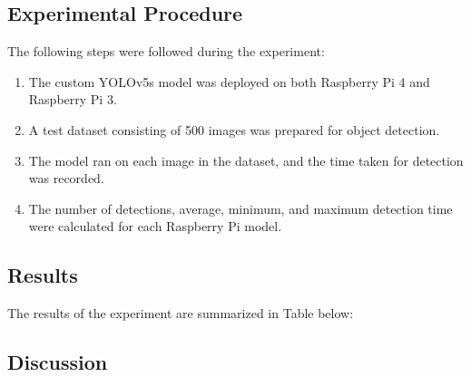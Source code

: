 \subsection{Experimental Procedure}
\vspace{1cm}
The following steps were followed during the experiment:

\begin{enumerate}
  \item The custom YOLOv5s model was deployed on both Raspberry Pi 4 and Raspberry Pi 3.
  \item A test dataset consisting of 500 images was prepared for object detection.
  \item The model ran on each image in the dataset, and the time taken for detection was recorded.
  \item The number of detections, average, minimum, and maximum detection time were calculated for each Raspberry Pi model.
\end{enumerate}

\subsection{Results}

The results of the experiment are summarized in Table below:
\FloatBarrier
\begin{table}[htbp]
\centering
{}
\end{table}
\FloatBarrier


\subsection{Discussion}

